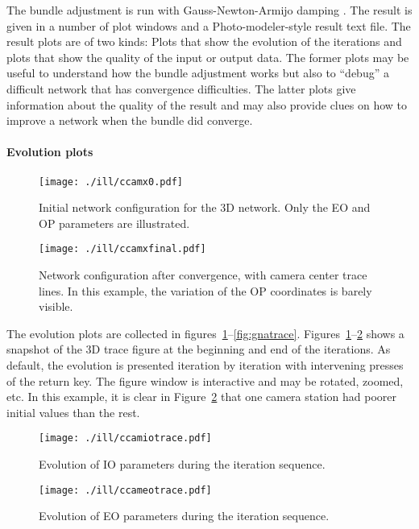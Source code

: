 \documentclass{article}
\begin{document}
The bundle adjustment is run with Gauss-Newton-Armijo damping
\citep{Borlin2013:Bundle}. The result is given in a number of plot
windows and a Photo-modeler-style result text file. The result plots
are of two kinds: Plots that show the evolution of the iterations and
plots that show the quality of the input or output data. The former
plots may be useful to understand how the bundle adjustment works but
also to ``debug'' a difficult network that has convergence
difficulties. The latter plots give information about the quality of
the result and may also provide clues on how to improve a network when
the bundle did converge.

\paragraph{Evolution plots}
\label{sec:org277c05b}

\begin{figure}[tbp]
\centering
\texttt{[image: ./ill/ccamx0.pdf]}
\caption{\label{fig:camx0}Initial network configuration for the 3D network. Only the EO and OP parameters are illustrated.}
\end{figure}

\begin{figure}[tbp]
\centering
\texttt{[image: ./ill/ccamxfinal.pdf]}
\caption{\label{fig:camxfinal}Network configuration after convergence, with camera center trace lines. In this example, the variation of the OP coordinates is barely visible.}
\end{figure}

The evolution plots are collected in
figures~\ref{fig:camx0}--\ref{fig:gnatrace}.
Figures~\ref{fig:camx0}--\ref{fig:camxfinal} shows a snapshot of the 3D trace
figure at the beginning and end of the iterations. As default, the
evolution is presented iteration by iteration with intervening presses
of the return key. The figure window is interactive and may be
rotated, zoomed, etc. In this example, it is clear in
Figure~\ref{fig:camxfinal} that one camera station had poorer initial
values than the rest.

\begin{figure}[tbp]
\centering
\texttt{[image: ./ill/ccamiotrace.pdf]}
\caption{\label{fig:IOtrace}Evolution of IO parameters during the iteration sequence.}
\end{figure}

\begin{figure}[tbp]
\centering
\texttt{[image: ./ill/ccameotrace.pdf]}
\caption{\label{fig:EOtrace}Evolution of EO parameters during the iteration sequence.}
\end{figure}
\end{document}
